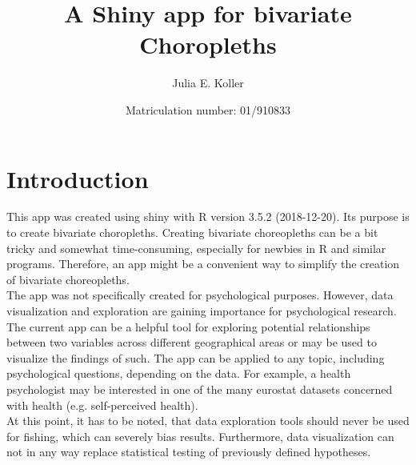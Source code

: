\documentclass[a4paper,10pt, onecolumn]{article}\usepackage[]{graphicx}\usepackage[]{color}
\title{A Shiny app for bivariate Choropleths}
\author{Julia E. Koller}
\date{Matriculation number: 01/910833} %
\begin{document}
 \maketitle
\begin{comment}

  \thispagestyle{mypagestyle}
	\nointerlineskip
  	\centerline{\rule{15.65cm}{.5pt}}
    \nointerlineskip

\begin{abstract}

\end{abstract}
	\nointerlineskip
  	\centerline{\rule{15.65cm}{.5pt}}
	\vspace{0.5cm}

\end{comment}

\section{Introduction}

This app was created using shiny \cite{Chang.2018} with R version 3.5.2 (2018-12-20). Its purpose is to create bivariate choropleths. Creating bivariate choreopleths can be a bit tricky and somewhat time-consuming, especially for newbies in R and similar programs. Therefore, an app might be a convenient way to simplify the creation of bivariate choreopleths. \\
\hspace*{2em} The app was not specifically created for psychological purposes. However, data visualization and exploration are gaining importance for psychological research. The current app can be a helpful tool for exploring potential relationships between two variables across different geographical areas or may be used to visualize the findings of such. The app can be applied to any topic, including psychological questions, depending on the data. For example, a health psychologist may be interested in one of the many eurostat datasets concerned with health (e.g. self-perceived health).\\
\hspace*{2em} At this point, it has to be noted, that data exploration tools should never be used for fishing, which can severely bias results. Furthermore, data visualization can not in any way replace statistical testing of previously defined hypotheses.

\end{document}
